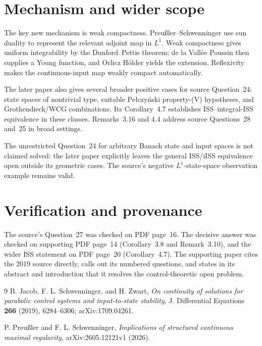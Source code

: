 \documentclass[11pt]{article}
\begin{document}
\section*{Mechanism and wider scope}

The key new mechanism is weak compactness. Preu\ss ler--Schwenninger use sun
duality to represent the relevant adjoint map in $L^1$. Weak compactness gives
uniform integrability by the Dunford--Pettis theorem; de la Vall\'ee Poussin
then supplies a Young function, and Orlicz H\"older yields the extension.
Reflexivity makes the continuous-input map weakly compact automatically.

The later paper also gives several broader positive cases for source
Question~24: state spaces of nontrivial type, suitable Pe\l czy\'nski
property-(V) hypotheses, and Grothendieck/WCG combinations. Its Corollary~4.7
establishes ISS--integral-ISS equivalence in these classes. Remarks~3.16 and
4.4 address source Questions~28 and~25 in broad settings.

The unrestricted Question~24 for arbitrary Banach state and input spaces is
not claimed solved: the later paper explicitly leaves the general ISS/iISS
equivalence open outside its geometric cases. The source's negative
$L^1$-state-space observation example remains valid.

\section*{Verification and provenance}

The source's Question~27 was checked on PDF page~16. The decisive answer was
checked on supporting PDF page~14 (Corollary~3.8 and Remark~3.10), and the
wider ISS statement on PDF page~20 (Corollary~4.7). The supporting paper cites
the 2019 source directly, calls out its numbered questions, and states in its
abstract and introduction that it resolves the control-theoretic open problem.

\begin{thebibliography}{9}
B. Jacob, F. L. Schwenninger, and H. Zwart,
\emph{On continuity of solutions for parabolic control systems and
input-to-state stability},
J. Differential Equations \textbf{266} (2019), 6284--6306;
arXiv:1709.04261.

P. Preu\ss ler and F. L. Schwenninger,
\emph{Implications of structured continuous maximal regularity},
arXiv:2605.12121v1 (2026).
\end{thebibliography}
\end{document}
